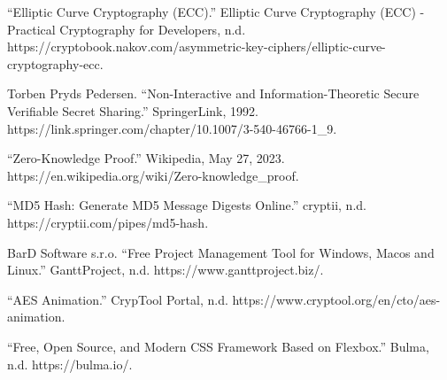 \begin{thebibliography}{9}
“Elliptic Curve Cryptography (ECC).” Elliptic Curve Cryptography (ECC) - Practical Cryptography for Developers, n.d. https://cryptobook.nakov.com/asymmetric-key-ciphers/elliptic-curve-cryptography-ecc. 

Torben Pryds Pedersen. “Non-Interactive and Information-Theoretic Secure Verifiable Secret Sharing.” SpringerLink, 1992. https://link.springer.com/chapter/10.1007/3-540-46766-1\_9. 

“Zero-Knowledge Proof.” Wikipedia, May 27, 2023. https://en.wikipedia.org/wiki/Zero-knowledge\_proof. 

“MD5 Hash: Generate MD5 Message Digests Online.” cryptii, n.d. https://cryptii.com/pipes/md5-hash. 

BarD Software s.r.o. “Free Project Management Tool for Windows, Macos and Linux.” GanttProject, n.d. https://www.ganttproject.biz/. 

“AES Animation.” CrypTool Portal, n.d. https://www.cryptool.org/en/cto/aes-animation. 

“Free, Open Source, and Modern CSS Framework Based on Flexbox.” Bulma, n.d. https://bulma.io/. 

\end{thebibliography}